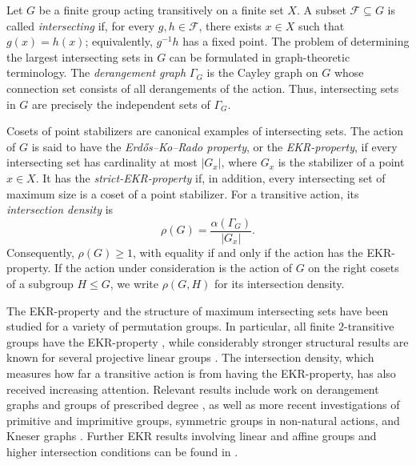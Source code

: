\documentclass[11pt]{article}
\begin{document}
Let $G$ be a finite group acting transitively on a finite set $X$. A
subset $\mathcal{F}\subseteq G$ is called \emph{intersecting} if, for
every $g,h\in\mathcal{F}$, there exists $x\in X$ such that
$g(x)=h(x)$; equivalently, $g^{-1}h$ has a fixed point. The problem of
determining the largest intersecting sets in $G$ can be formulated in
graph-theoretic terminology. The \emph{derangement graph} $\Gamma_G$
is the Cayley graph on $G$ whose connection set consists of all
derangements of the action. Thus, intersecting sets in $G$ are
precisely the independent sets of $\Gamma_G$.

Cosets of point stabilizers are canonical examples of intersecting
sets. The action of $G$ is said to have the
\emph{Erd\H{o}s--Ko--Rado property}, or the \emph{EKR-property}, if
every intersecting set has cardinality at most $|G_x|$, where $G_x$ is
the stabilizer of a point $x\in X$. It has the
\emph{strict-EKR-property} if, in addition, every intersecting set of
maximum size is a coset of a point stabilizer. For a transitive
action, its \emph{intersection density} is
\[
\rho(G)=\frac{\alpha(\Gamma_G)}{|G_x|}.
\]
Consequently, $\rho(G)\geq 1$, with equality if and only if the action
has the EKR-property. If the action under consideration is the action
of $G$ on the right cosets of a subgroup $H\leq G$, we write
$\rho(G,H)$ for its intersection density.

The EKR-property and the structure of maximum intersecting sets have
been studied for a variety of permutation groups. In particular, all
finite $2$-transitive groups have the EKR-property
\cite{MeagherSpigaTiep2016}, while considerably stronger structural
results are known for several projective linear groups
\cite{LongPlazaSinXiang2018,MeagherSpiga2011,MeagherSpiga2014,Spiga2019}.
The intersection density, which measures how far a transitive action
is from having the EKR-property, has also received increasing
attention. Relevant results include work on derangement graphs and
groups of prescribed degree
\cite{HujdurovicKutnarKuzmaMarusicMiklavicOrel2022,HujdurovicKutnarMarusicMiklavic2022CertainDegrees,MeagherRazafimahatratraSpiga2021,Razafimahatratra2021},
as well as more recent investigations of primitive and imprimitive
groups, symmetric groups in non-natural actions, and Kneser graphs
\cite{BehajainaMalekiRazafimahatratra2023,
BehajainaMalekiRazafimahatratra2024,
MeagherRazafimahatratra2024,Razafimahatratra2023}.
Further EKR results involving linear and affine groups and higher
intersection conditions can be found in
\cite{MeagherRazafimahatratra2021,
MeagherRazafimahatratra2023}.
\end{document}

